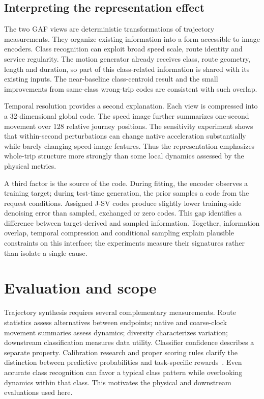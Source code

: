 \subsection{Interpreting the representation effect}
The two GAF views are deterministic transformations of trajectory measurements. They organize existing information into a form accessible to image encoders. Class recognition can exploit broad speed scale, route identity and service regularity. The motion generator already receives class, route geometry, length and duration, so part of this class-related information is shared with its existing inputs. The near-baseline class-centroid result and the small improvements from same-class wrong-trip codes are consistent with such overlap.

Temporal resolution provides a second explanation. Each view is compressed into a 32-dimensional global code. The speed image further summarizes one-second movement over 128 relative journey positions. The sensitivity experiment shows that within-second perturbations can change native acceleration substantially while barely changing speed-image features. Thus the representation emphasizes whole-trip structure more strongly than some local dynamics assessed by the physical metrics.

A third factor is the source of the code. During fitting, the encoder observes a training target; during test-time generation, the prior samples a code from the request conditions. Assigned J-SV codes produce slightly lower training-side denoising error than sampled, exchanged or zero codes. This gap identifies a difference between target-derived and sampled information. Together, information overlap, temporal compression and conditional sampling explain plausible constraints on this interface; the experiments measure their signatures rather than isolate a single cause.

\section{Evaluation and scope}
Trajectory synthesis requires several complementary measurements. Route statistics assess alternatives between endpoints; native and coarse-clock movement summaries assess dynamics; diversity characterizes variation; downstream classification measures data utility. Classifier confidence describes a separate property. Calibration research and proper scoring rules clarify the distinction between predictive probabilities and task-specific rewards~\cite{calibration,gneiting2007}. Even accurate class recognition can favor a typical class pattern while overlooking dynamics within that class. This motivates the physical and downstream evaluations used here.

